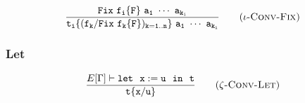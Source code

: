 \begin{equation*}
\frac{\tt Fix\ f_i\{F\}\ a_1\ \cdots\ a_{k_i}}
    {\tt t_i\{(f_k/Fix\ f_k\{F\})_{k=1..n}\}\ a_1\ \cdots\ a_{k_i}}
    \tag{\sc $\iota$-Conv-Fix}
\end{equation*}

\subsubsection{Let}

\begin{Def}
\begin{equation*}
\frac{E[\Gamma]\vdash \tt let\ \ x:=u\ \ in\ \ t}
    {\tt t\{x/u\}}
    \tag{\sc $\zeta$-Conv-Let}
\end{equation*}
\end{Def}

